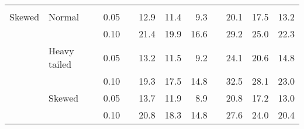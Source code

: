 \begin{table}[ht]
\begin{scriptsize}
\begin{center}
\begin{tabular}{ll p{.1cm} c p{.1cm} rrr p{.1cm} rrr}
&&&&&&&&&&&\\
Skewed       & Normal       && 0.05 &&   12.9 & 11.4 & 9.3 &   & 20.1 & 17.5 & 13.2 \\ 
             &              && 0.10 &&   21.4 & 19.9 & 16.6 &   & 29.2 & 25.0 & 22.3 \\ 
             & Heavy tailed && 0.05 &&   13.2 & 11.5 & 9.2 &   & 24.1 & 20.6 & 14.8 \\ 
             &              && 0.10 &&   19.3 & 17.5 & 14.8 &   & 32.5 & 28.1 & 23.0 \\ 
             & Skewed       && 0.05 &&   13.7 & 11.9 & 8.9 &   & 20.8 & 17.2 & 13.0 \\ 
             &              && 0.10 &&   20.8 & 18.3 & 14.8 &   & 27.6 & 24.0 & 20.4 \\ 


\end{tabular}
\end{center}
\end{scriptsize}
\end{table}
